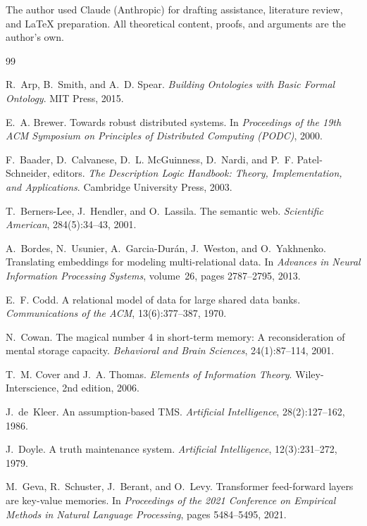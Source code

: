 \documentclass[11pt]{article}
\theoremstyle{definition}
\begin{document}
The author used Claude (Anthropic) for drafting assistance, literature review, and \LaTeX{} preparation. All theoretical content, proofs, and arguments are the author's own.


\begin{thebibliography}{99}

R.~Arp, B.~Smith, and A.~D. Spear.
\newblock \emph{Building Ontologies with Basic Formal Ontology}.
\newblock MIT Press, 2015.

E.~A. Brewer.
\newblock Towards robust distributed systems.
\newblock In \emph{Proceedings of the 19th ACM Symposium on Principles of
Distributed Computing (PODC)}, 2000.

F.~Baader, D.~Calvanese, D.~L. McGuinness, D.~Nardi, and P.~F.
  Patel-Schneider, editors.
\newblock \emph{The Description Logic Handbook: Theory, Implementation, and
  Applications}.
\newblock Cambridge University Press, 2003.

T.~Berners-Lee, J.~Hendler, and O.~Lassila.
\newblock The semantic web.
\newblock \emph{Scientific American}, 284(5):34--43, 2001.

A.~Bordes, N.~Usunier, A.~Garcia-Dur{\'a}n, J.~Weston, and
  O.~Yakhnenko.
\newblock Translating embeddings for modeling multi-relational data.
\newblock In \emph{Advances in Neural Information Processing Systems},
  volume~26, pages 2787--2795, 2013.

E.~F. Codd.
\newblock A relational model of data for large shared data banks.
\newblock \emph{Communications of the ACM}, 13(6):377--387, 1970.

N.~Cowan.
\newblock The magical number 4 in short-term memory: A reconsideration of
  mental storage capacity.
\newblock \emph{Behavioral and Brain Sciences}, 24(1):87--114, 2001.

T.~M. Cover and J.~A. Thomas.
\newblock \emph{Elements of Information Theory}.
\newblock Wiley-Interscience, 2nd edition, 2006.

J.~de~Kleer.
\newblock An assumption-based {TMS}.
\newblock \emph{Artificial Intelligence}, 28(2):127--162, 1986.

J.~Doyle.
\newblock A truth maintenance system.
\newblock \emph{Artificial Intelligence}, 12(3):231--272, 1979.


M.~Geva, R.~Schuster, J.~Berant, and O.~Levy.
\newblock Transformer feed-forward layers are key-value memories.
\newblock In \emph{Proceedings of the 2021 Conference on Empirical Methods in
  Natural Language Processing}, pages 5484--5495, 2021.


\end{thebibliography}
\end{document}
